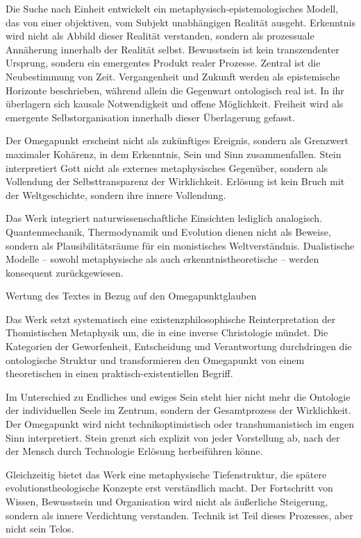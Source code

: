 \documentclass[
]{article}
\begin{document}
Die Suche nach Einheit entwickelt ein metaphysisch-epistemologisches Modell, das von einer objektiven, vom Subjekt unabhängigen Realität ausgeht. Erkenntnis wird nicht als Abbild dieser Realität verstanden, sondern als prozessuale Annäherung innerhalb der Realität selbst. Bewusstsein ist kein transzendenter Ursprung, sondern ein emergentes Produkt realer Prozesse. Zentral ist die Neubestimmung von Zeit. Vergangenheit und Zukunft werden als epistemische Horizonte beschrieben, während allein die Gegenwart ontologisch real ist. In ihr überlagern sich kausale Notwendigkeit und offene Möglichkeit. Freiheit wird als emergente Selbstorganisation innerhalb dieser Überlagerung gefasst.

Der Omegapunkt erscheint nicht als zukünftiges Ereignis, sondern als Grenzwert maximaler Kohärenz, in dem Erkenntnis, Sein und Sinn zusammenfallen. Stein interpretiert Gott nicht als externes metaphysisches Gegenüber, sondern als Vollendung der Selbsttransparenz der Wirklichkeit. Erlösung ist kein Bruch mit der Weltgeschichte, sondern ihre innere Vollendung.

Das Werk integriert naturwissenschaftliche Einsichten lediglich analogisch. Quantenmechanik, Thermodynamik und Evolution dienen nicht als Beweise, sondern als Plausibilitätsräume für ein monistisches Weltverständnis. Dualistische Modelle -- sowohl metaphysische als auch erkenntnistheoretische -- werden konsequent zurückgewiesen.

Wertung des Textes in Bezug auf den Omegapunktglauben

Das Werk setzt systematisch eine existenzphilosophische Reinterpretation der Thomistischen Metaphysik um, die in eine inverse Christologie mündet. Die Kategorien der Geworfenheit, Entscheidung und Verantwortung durchdringen die ontologische Struktur und transformieren den Omegapunkt von einem theoretischen in einen praktisch-existentiellen Begriff.

Im Unterschied zu Endliches und ewiges Sein steht hier nicht mehr die Ontologie der individuellen Seele im Zentrum, sondern der Gesamtprozess der Wirklichkeit. Der Omegapunkt wird nicht technikoptimistisch oder transhumanistisch im engen Sinn interpretiert. Stein grenzt sich explizit von jeder Vorstellung ab, nach der der Mensch durch Technologie Erlösung herbeiführen könne.

Gleichzeitig bietet das Werk eine metaphysische Tiefenstruktur, die spätere evolutionstheologische Konzepte erst verständlich macht. Der Fortschritt von Wissen, Bewusstsein und Organisation wird nicht als äußerliche Steigerung, sondern als innere Verdichtung verstanden. Technik ist Teil dieses Prozesses, aber nicht sein Telos.
\end{document}
